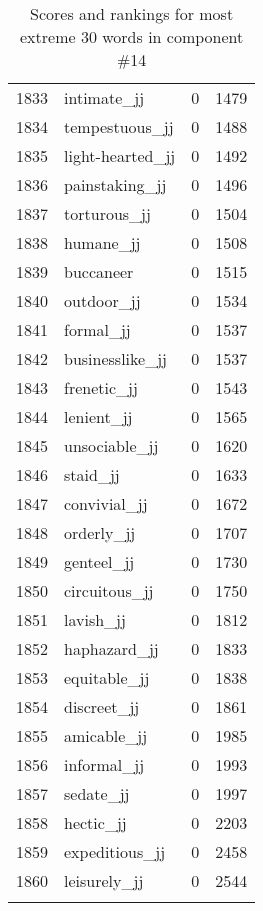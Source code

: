 \begin{longtable}[!htbp]{| rlr@{.}l |}
    1833 & intimate\_jj & 0 & 1479 \\
    1834 & tempestuous\_jj & 0 & 1488 \\
    1835 & light-hearted\_jj & 0 & 1492 \\
    1836 & painstaking\_jj & 0 & 1496 \\
    1837 & torturous\_jj & 0 & 1504 \\
    1838 & humane\_jj & 0 & 1508 \\
    1839 & buccaneer & 0 & 1515 \\
    1840 & outdoor\_jj & 0 & 1534 \\
    1841 & formal\_jj & 0 & 1537 \\
    1842 & businesslike\_jj & 0 & 1537 \\
    1843 & frenetic\_jj & 0 & 1543 \\
    1844 & lenient\_jj & 0 & 1565 \\
    1845 & unsociable\_jj & 0 & 1620 \\
    1846 & staid\_jj & 0 & 1633 \\
    1847 & convivial\_jj & 0 & 1672 \\
    1848 & orderly\_jj & 0 & 1707 \\
    1849 & genteel\_jj & 0 & 1730 \\
    1850 & circuitous\_jj & 0 & 1750 \\
    1851 & lavish\_jj & 0 & 1812 \\
    1852 & haphazard\_jj & 0 & 1833 \\
    1853 & equitable\_jj & 0 & 1838 \\
    1854 & discreet\_jj & 0 & 1861 \\
    1855 & amicable\_jj & 0 & 1985 \\
    1856 & informal\_jj & 0 & 1993 \\
    1857 & sedate\_jj & 0 & 1997 \\
    1858 & hectic\_jj & 0 & 2203 \\
    1859 & expeditious\_jj & 0 & 2458 \\
    1860 & leisurely\_jj & 0 & 2544 \\
    \hline
    \caption{Scores and rankings for most extreme 30 words in component \#14} \\
\end{longtable}
